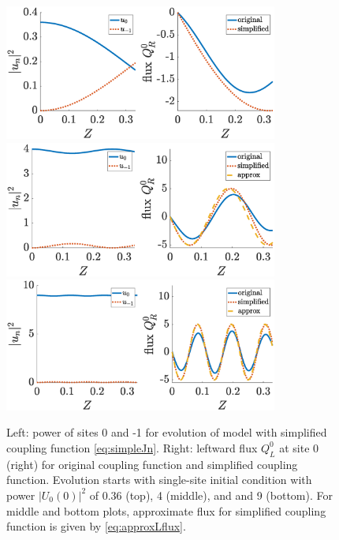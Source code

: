 \documentclass[reprint, amsmath,amssymb,aps,pre]{revtex4-2}
\begin{document}
\begin{figure}
    \centering
    \includegraphics[width=9cm]{simplemodelL06.eps}
    \includegraphics[width=9cm]{simplemodelstat2.eps}
    \includegraphics[width=9cm]{simplemodelstat3.eps}
    \caption{Left: power of sites 0 and -1 for evolution of model with simplified coupling function \cref{eq:simpleJn}. Right: leftward flux $Q_L^0$ at site 0 (right) for original coupling function and simplified coupling function. Evolution starts with single-site initial condition with power $|U_0(0)|^2$ of 0.36 (top), 4 (middle), and and 9 (bottom). For middle and bottom plots, approximate flux for simplified coupling function is given by \cref{eq:approxLflux}.}
    \label{fig:simplemodel1}
\end{figure}
\end{document}
